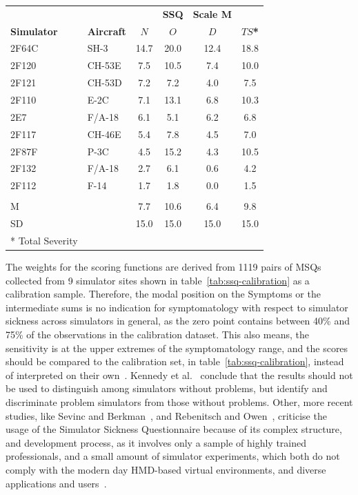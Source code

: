 \begin{center}
    \begin{tabular}{ l l c c c c}
        \toprule
         & & & \textbf{SSQ} & \textbf{Scale M} & \\
        \textbf{Simulator} & \textbf{Aircraft} & \textbf{$N$} & \textbf{$O$} & \textbf{$D$} & \textbf{$TS$*} \\
        \midrule
        2F64C & SH-3   & 14.7 & 20.0 & 12.4 & 18.8 \\
        2F120 & CH-53E & 7.5  & 10.5 & 7.4  & 10.0 \\
        2F121 & CH-53D & 7.2  & 7.2  & 4.0  & 7.5  \\
        2F110 & E-2C   & 7.1  & 13.1 & 6.8  & 10.3 \\
        2E7   & F/A-18 & 6.1  & 5.1  & 6.2  & 6.8  \\
        2F117 & CH-46E & 5.4  & 7.8  & 4.5  & 7.0  \\
        2F87F & P-3C   & 4.5  & 15.2 & 4.3  & 10.5 \\
        2F132 & F/A-18 & 2.7  & 6.1  & 0.6  & 4.2  \\
        2F112 & F-14   & 1.7  & 1.8  & 0.0  & 1.5  \\
              &        &      &      &      &      \\
        M     &        & 7.7  & 10.6 & 6.4  & 9.8  \\
        SD    &        & 15.0 & 15.0 & 15.0 & 15.0 \\
        \bottomrule
        * Total Severity & & & & & \\
    \end{tabular}
    \label{tab:ssq-calibration}
\end{center}
The weights for the scoring functions are derived from 1119 pairs of MSQs collected from 9 simulator sites
shown in table~\ref{tab:ssq-calibration} as a calibration sample.
Therefore, the modal position on the Symptoms or the intermediate sums is no indication for symptomatology with
respect to simulator sickness across simulators in general, as the zero point contains between 40\% and 75\% of the
observations in the calibration dataset.
This also means, the sensitivity is at the upper extremes of the symptomatology range, and the scores should be
compared to the calibration set, in table~\ref{tab:ssq-calibration}, instead of
interpreted on their own~\cite{Kennedy1993}.
Kennedy et al.~\cite{Kennedy1993} conclude that the results should not be used to distinguish among simulators without
problems, but identify and discriminate problem simulators from those without problems.
Other, more recent studies, like Sevinc and Berkman~\cite{Sevinc2020}, and Rebenitsch and Owen~\cite{Rebenitsch2016},
criticise the usage of the Simulator Sickness Questionnaire because of its complex structure, and development
process, as it involves only a sample of highly trained professionals, and a small amount of simulator experiments,
which both do not comply with the modern day HMD-based virtual environments, and diverse applications
and users~\cite{Sevinc2020}.

